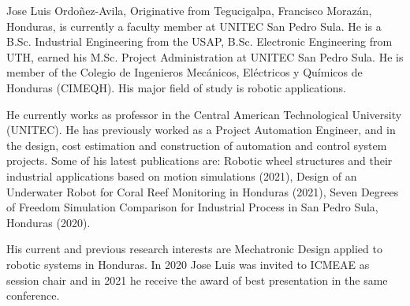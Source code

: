 \documentclass{ieeeaccess}
\begin{document}
\begin{IEEEbiography}{Jose Luis Ordoñez-Avila}, Originative from Tegucigalpa, Francisco Morazán, Honduras, is currently a faculty member at UNITEC San Pedro Sula. He is a B.Sc. Industrial Engineering from the USAP, B.Sc. Electronic Engineering from UTH, earned his M.Sc. Project Administration at UNITEC San Pedro Sula. He is member of the Colegio de 
Ingenieros Mecánicos, Eléctricos y Químicos de Honduras (CIMEQH). His major field of study is robotic applications.

He currently works as professor in the Central American Technological University (UNITEC). He has previously worked as a Project Automation Engineer, and in the design, cost estimation and construction 
of automation and control system projects. Some of his latest publications are: Robotic wheel structures and their industrial applications based on motion simulations (2021), Design of an Underwater Robot for Coral Reef Monitoring in Honduras (2021), Seven Degrees of Freedom Simulation Comparison for Industrial Process in San Pedro Sula, Honduras (2020). 

His current and previous research interests are Mechatronic Design applied to robotic systems in Honduras. In 2020 Jose Luis was invited to ICMEAE as session chair and in 2021 he receive the award of best presentation in the same conference.
\end{IEEEbiography}

\EOD
\end{document}
